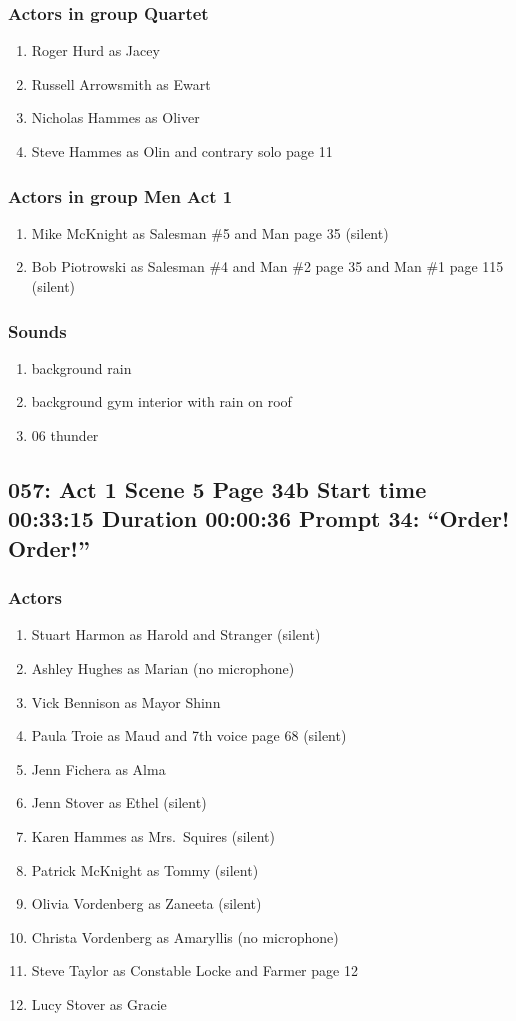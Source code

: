 \subsubsection{Actors in group Quartet}
\begin{enumerate}
\item Roger Hurd as Jacey
\item Russell Arrowsmith as Ewart
\item Nicholas Hammes as Oliver
\item Steve Hammes as Olin and contrary solo page 11
\end{enumerate}
\subsubsection{Actors in group Men Act 1}
\begin{enumerate}
\item Mike McKnight as Salesman \#5 and Man page 35 (silent)
\item Bob Piotrowski as Salesman \#4 and Man \#2 page 35 and Man \#1 page 115 (silent)
\end{enumerate}

\subsubsection{Sounds}
\begin{enumerate}
\item background rain
\item background gym interior with rain on roof
\item 06 thunder
\end{enumerate}
\subsection{057: Act 1 Scene 5 Page 34b Start time 00:33:15 Duration 00:00:36 Prompt 34: ``Order! Order!''}

\subsubsection{Actors}
\begin{enumerate}
\item Stuart Harmon as Harold and Stranger (silent)
\item Ashley Hughes as Marian (no microphone)
\item Vick Bennison as Mayor Shinn
\item Paula Troie as Maud and 7th voice page 68 (silent)
\item Jenn Fichera as Alma
\item Jenn Stover as Ethel (silent)
\item Karen Hammes as Mrs.~Squires (silent)
\item Patrick McKnight as Tommy (silent)
\item Olivia Vordenberg as Zaneeta (silent)
\item Christa Vordenberg as Amaryllis (no microphone)
\item Steve Taylor as Constable Locke and Farmer page 12
\item Lucy Stover as Gracie
\end{enumerate}
